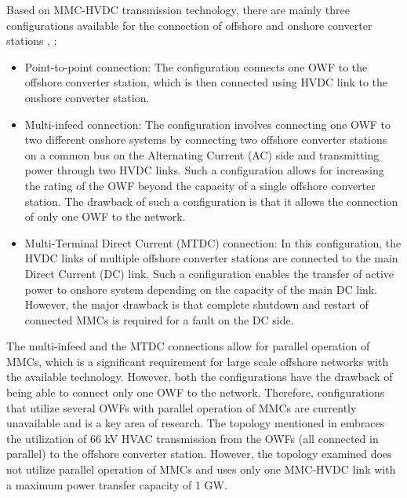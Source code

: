 Based on \gls{MMC}-\gls{HVDC} transmission technology, there are mainly three configurations available for the connection of offshore and onshore converter stations \cite{cigre_B455}, \cite{sharifabadi2016design}: 
\begin{itemize}
    \item Point-to-point connection: The configuration connects one \gls{OWF} to the offshore converter station, which is then connected using \gls{HVDC} link to the onshore converter station.
    \item Multi-infeed connection: The configuration involves connecting one \gls{OWF} to two different onshore systems by connecting two offshore converter stations on a common bus on the Alternating Current (\gls{AC}) side and transmitting power through two \gls{HVDC} links. Such a configuration allows for increasing the rating of the \gls{OWF} beyond the capacity of a single offshore converter station. The drawback of such a configuration is that it allows the connection of only one \gls{OWF} to the network.
    \item Multi-Terminal Direct
    Current (MTDC) connection: In this configuration, the \gls{HVDC} links of multiple offshore converter stations are connected to the main Direct Current (\gls{DC}) link. Such a configuration enables the transfer of active power to onshore system depending on the capacity of the main \gls{DC} link. However, the major drawback is that complete shutdown and restart of connected \gls{MMC}s is required for a fault on the \gls{DC} side.
\end{itemize}

The multi-infeed and the MTDC connections allow for parallel operation of \gls{MMC}s, which is a significant requirement for large scale offshore networks with the available technology. However, both the configurations have the drawback of being able to connect only one \gls{OWF} to the network. Therefore, configurations that utilize several \gls{OWF}s with parallel operation of \gls{MMC}s are currently unavailable and is a key area of research. The topology mentioned in \cite{lozada_ayala_dynamic_2018} embraces the utilization of 66 kV \gls{HVAC} transmission from the \gls{OWF}s (all connected in parallel) to the offshore converter station. However, the topology examined does not utilize parallel operation of \gls{MMC}s and uses only one \gls{MMC}-\gls{HVDC} link with a maximum power transfer capacity of 1 GW.


